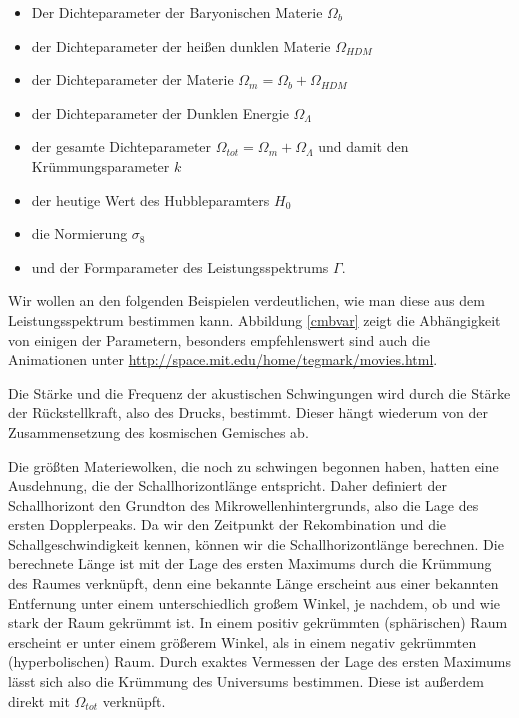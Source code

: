 \documentclass[10pt,a4paper]{article}
\begin{document}
\begin{itemize}
\item Der Dichteparameter der Baryonischen Materie $\Omega_b$
\item der Dichteparameter der heißen dunklen Materie $\Omega_{HDM}$
\item der Dichteparameter der Materie $\Omega_m=\Omega_b+\Omega_{HDM}$
\item der Dichteparameter der Dunklen Energie $\Omega_\Lambda$
\item der gesamte Dichteparameter $\Omega_{tot}=\Omega_m+\Omega_\Lambda$ und damit den Krümmungsparameter $k$
\item der heutige Wert des Hubbleparamters $H_0$
\item die Normierung $\sigma_8$
\item und der Formparameter des Leistungsspektrums $\Gamma$.\cite{Schneider}
\end{itemize}
Wir wollen an den folgenden Beispielen verdeutlichen, wie man diese aus dem Leistungsspektrum bestimmen kann. Abbildung \ref{cmbvar} zeigt die Abhängigkeit von einigen der Parametern, besonders empfehlenswert sind auch die Animationen unter \url{http://space.mit.edu/home/tegmark/movies.html}.

Die Stärke und die Frequenz der akustischen Schwingungen wird durch die Stärke der Rückstellkraft, also des Drucks, bestimmt. Dieser hängt wiederum von der Zusammensetzung des kosmischen Gemisches ab.\cite{S+W00}

Die größten Materiewolken, die noch zu schwingen begonnen haben, hatten eine Ausdehnung, die der Schallhorizontlänge entspricht. Daher definiert der Schallhorizont den Grundton des Mikrowellenhintergrunds, also die Lage des ersten Dopplerpeaks. Da wir den Zeitpunkt der Rekombination und die Schallgeschwindigkeit kennen, können wir die Schallhorizontlänge berechnen. Die berechnete Länge ist mit der Lage des ersten Maximums durch die Krümmung des Raumes verknüpft, denn eine bekannte Länge erscheint aus einer bekannten Entfernung unter einem unterschiedlich großem Winkel, je nachdem, ob und wie stark der Raum gekrümmt ist. In einem positiv gekrümmten (sphärischen) Raum erscheint er unter einem größerem Winkel, als in einem negativ gekrümmten (hyperbolischen) Raum. Durch exaktes Vermessen der Lage des ersten Maximums lässt sich also die Krümmung des Universums bestimmen. Diese ist außerdem direkt mit $\Omega_{tot}$ verknüpft.\cite{S+W03}
\end{document}

